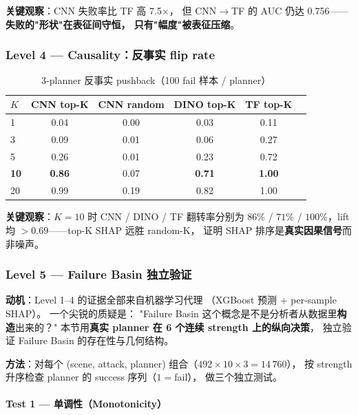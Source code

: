 \documentclass[a4paper,12pt,fontset=fandol]{ctexart}
\newcommand{\planner}[1]{\textsf{#1}}
\begin{document}
{\noindent\textbf{关键观察}：CNN 失败率比 TF 高 7.5$\times$，
但 CNN$\to$TF 的 AUC 仍达 0.756——\textbf{失败的"形状"在表征间守恒，
只有"幅度"被表征压缩}。

\subsubsection{Level 4 — Causality：反事实 flip rate}

\begin{table}[H]
\centering
\small
\caption{3-planner 反事实 pushback（100 fail 样本 / planner）}
\label{tab:causality}
\begin{tabular}{lccccc}
\toprule
\textbf{$K$} & \planner{CNN} top-K & \planner{CNN} random & \planner{DINO} top-K & \planner{TF} top-K \\
\midrule
1   & 0.04 & 0.00 & 0.03 & 0.11 \\
3   & 0.09 & 0.01 & 0.06 & 0.27 \\
5   & 0.26 & 0.01 & 0.23 & 0.72 \\
\textbf{10}  & \textbf{0.86} & 0.07 & \textbf{0.71} & \textbf{1.00} \\
20  & 0.99 & 0.19 & 0.82 & 1.00 \\
\bottomrule
\end{tabular}
\end{table}

\noindent\textbf{关键观察}：$K\!=\!10$ 时 CNN / DINO / TF 翻转率分别为
$86\%$ / $71\%$ / $100\%$，lift 均 $> 0.69$——top-K SHAP 远胜 random-K，
证明 SHAP 排序是\textbf{真实因果信号}而非噪声。

\subsubsection{Level 5 — Failure Basin 独立验证}
\label{sec:basin}

\noindent\textbf{动机}：Level 1--4 的证据全部来自机器学习代理
（XGBoost 预测 + per-sample SHAP）。
一个尖锐的质疑是：
"Failure Basin 这个概念是不是分析者从数据里\textbf{构造}出来的？"
本节用\textbf{真实 planner 在 6 个连续 strength 上的纵向决策}，
独立验证 Failure Basin 的存在性与几何结构。

\noindent\textbf{方法}：对每个 (scene, attack, planner) 组合（$492\!\times\!10\!\times\!3 = 14\,760$），
按 strength 升序检查 planner 的 success 序列（$1\!=\!$fail），
做三个独立测试。

\paragraph{Test 1 --- 单调性（Monotonicity）}

}
\end{document}
